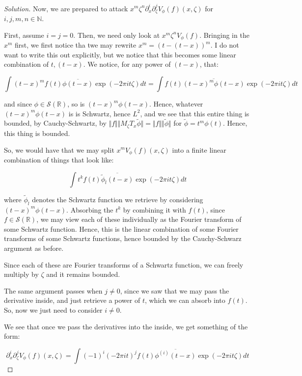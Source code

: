 \documentclass[10pt]{article}
\begin{document}
\begin{proof}[Solution]
Now, we are prepared to attack $x^m \zeta^n \partial_x^i \partial_\zeta^j V_\phi(f)(x, \zeta)$ for $i, j, m, n \in \mathbb{N}$.

First, assume $i = j = 0$. Then, we need only look at $x^m \zeta^n V_\phi(f)$. Bringing in the $x^m$ first, we first notice tha twe may rewrite $x^m = (t - (t-x))^m$. I do not want to write this out explicitly, but we notice that this becomes some linear combination of $t, (t-x)$. We notice, for any power of $(t-x)$, that:

$$ \int (t-x)^m f(t) \overline{\phi(t - x)} \exp(-2\pi i t \zeta) dt  = \int f(t) \overline{(t-x)^m\phi(t-x)} \exp(-2\pi i t \zeta) dt $$

and since $\phi \in \mathcal{S}(\mathbb{R})$, so is $(t-x)^m \phi(t-x)$. Hence, whatever $(t- x)^m \phi(t-x)$ is is Schwartz, hence $L^2$, and we see that this entire thing is bounded, by Cauchy-Schwartz, by $\Vert f \Vert \Vert M_\zeta T_x \tilde{\phi} \Vert  = \Vert f \Vert \Vert \tilde{\phi} \Vert$ for $\tilde{\phi} = t^m \phi(t)$. Hence, this thing is bounded. 

So, we would have that we may split $ x^m V_\phi(f)(x, \zeta)$ into a finite linear combination of things that look like:

$$ \int t^k f(t) \overline{ \tilde{\phi}_l(t - x)} \exp(-2 \pi i t \zeta) dt $$

where $\tilde{\phi}_l$ denotes the Schwartz function we retrieve by considering $(t-x)^m \phi(t-x)$. Absorbing the $t^k$ by combining it with $f(t)$, since $f \in \mathcal{S}(\mathbb{R})$, we may view each of these individually as the Fourier transform of some Schwartz function. Hence, this is the linear combination of some Fourier transforms of some Schwartz functions, hence bounded  by the Cauchy-Schwarz argument as before.

Since each of these are Fourier transforms of a Schwartz function, we can freely multiply by $\zeta$ and it remains bounded.

The same argument passes when $j \not = 0$, since we saw that we may pass the derivative inside, and just retrieve a power of $t$, which we can absorb into $f(t)$. So, now we just need to consider $i \not = 0$.

We see that once we pass the derivatives into the inside, we get something of the form:

$$  \partial_x^i \partial_\zeta^j V_\phi(f)(x, \zeta)  = \int (-1)^i (-2 \pi i t)^j f(t) \overline{\phi^{(i)}(t - x)} \exp(-2 \pi i t \zeta) dt $$


\end{proof}
\end{document}
